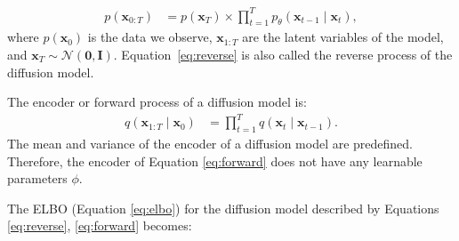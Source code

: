 \documentclass[11pt,addpoints,answers]{exam}
\newcommand{\xv}{\mathbf{x}}
\begin{document}
\begin{questions}
\begin{align}
p(\xv_{0:T}) &= p(\xv_T) \times \prod_{t=1}^{T}p_{\theta}(\xv_{t-1} \mid \xv_t),
\label{eq:reverse}
\end{align}
where $p(\xv_0)$ is the data we observe, $\xv_{1:T}$ are the latent variables of the model, and $\xv_T \sim \mathcal{N}(\boldsymbol{0},\boldsymbol{I})$. Equation~\eqref{eq:reverse} is also called the reverse process of the diffusion model.

The encoder or forward process of a diffusion model is:
\begin{align}
q(\xv_{1:T}\mid \xv_0) &=  \prod_{t=1}^{T}q(\xv_{t} \mid \xv_{t-1}).
\label{eq:forward}
\end{align}
The mean and variance of the encoder of a diffusion model are predefined. Therefore, the encoder of Equation \ref{eq:forward} does not have any learnable parameters $\phi$.

The ELBO (Equation \ref{eq:elbo}) for the diffusion model described by Equations \ref{eq:reverse}, \ref{eq:forward} becomes:


\end{questions}
\end{document}
